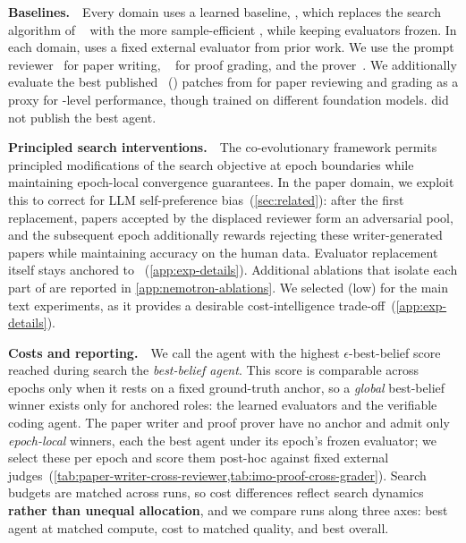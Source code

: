 \noindent\textbf{Baselines.}~~Every domain uses a learned baseline, \hgmh, which replaces the \dgm search algorithm of \hyperagents~\citep{zhang2026hyperagents} with the more sample-efficient \hgm, while keeping evaluators frozen.  In each domain, \hgmh uses a fixed external evaluator from prior work. We use the \sakana prompt reviewer~\citep{lu2024ai} for paper  writing, \proofautograder~\citep{luong2025towards} for proof grading, and the \imocode prover~\citep{huang2025winninggoldimo2025}. We additionally evaluate the best published \hyperagents~(\dgmh) patches from \citet{zhang2026hyperagents} for paper reviewing and grading as a proxy for \dgm-level performance, though trained on different foundation models.  \citet{zhang2026hyperagents} did not publish the best \polyglot agent.


\noindent\textbf{Principled search interventions.}~~The co-evolutionary framework permits principled modifications of the search objective at epoch boundaries while maintaining epoch-local convergence guarantees. In the paper domain, we exploit this to correct for LLM self-preference bias~(\cref{sec:related}): after the first replacement, papers accepted by the displaced reviewer form an adversarial pool, and the subsequent epoch additionally rewards rejecting these writer-generated papers while maintaining accuracy on the human \apres data. Evaluator replacement itself stays anchored to \apres~(\cref{app:exp-details}). Additional ablations that isolate each part of \ourmethod are reported in \cref{app:nemotron-ablations}. We selected \gptlow (low) for the main text experiments, as it provides a desirable cost-intelligence trade-off~(\cref{app:exp-details}). 

\noindent\textbf{Costs and reporting.}~~We call the agent with the highest $\epsilon$-best-belief score reached during search the \emph{best-belief agent}. This score is comparable across epochs only when it rests on a fixed ground-truth anchor, so a \emph{global} best-belief winner exists only for anchored roles: the learned evaluators and the verifiable coding agent. The paper writer and proof prover have no anchor and admit only \emph{epoch-local} winners, each the best agent under its epoch's frozen evaluator; we select these per epoch and score them post-hoc against fixed external judges~(\cref{tab:paper-writer-cross-reviewer,tab:imo-proof-cross-grader}). Search budgets are matched across runs, so cost differences reflect search dynamics \textbf{rather than unequal allocation}, and we compare runs along three axes: best agent at matched compute, cost to matched quality, and best overall.

